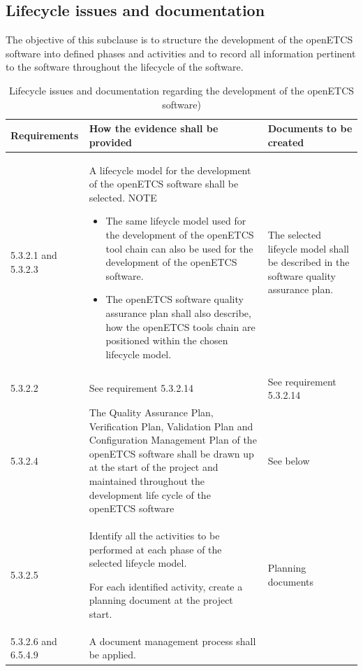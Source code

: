 \documentclass{template/openetcs_report}
\begin{document}
\subsection{Lifecycle issues and documentation}
\label{SDLC2}
\begin{flushleft}
The objective of this subclause is to structure the development of the openETCS software into defined phases and activities and to record all information pertinent to the software throughout the lifecycle of the software.
\end{flushleft}
{\footnotesize\sffamily\centering
\begin{longtable}{|p{2cm}|p{9cm}|p{3cm}|}
\caption{Lifecycle issues and documentation regarding the development of the openETCS software)}\\
\hline
\bfseries Requirements & \bfseries How the evidence shall be provided & \bfseries Documents to be created\\
\hline
\hline
\endhead
\hline
\endfoot

5.3.2.1 and 5.3.2.3 & A lifecycle model for the development of the openETCS software shall be selected.
\linebreak
\linebreak
NOTE
\begin{itemize}\itemsep=0pt
  \item The same lifeycle model used for the development of the openETCS tool chain can also be used for the development of the openETCS software.
  \item The openETCS software quality assurance plan shall also describe, how the openETCS tools chain are positioned within the chosen lifecycle model.
\end{itemize}
& The selected lifeycle model shall be described in the software quality assurance plan.\\ 
\hline
5.3.2.2 & See requirement 5.3.2.14 & See requirement 5.3.2.14\\ 
\hline
5.3.2.4 & The Quality Assurance Plan, Verification Plan, Validation Plan and Configuration Management Plan of the openETCS software shall be drawn up at the start of the project and maintained throughout the development life cycle of the openETCS software & See below\\ 
\hline
5.3.2.5 & Identify all the activities to be performed at each phase of the selected lifeycle model. 

For each identified activity, create a planning document at the project start.
& Planning documents\\ 
\hline
5.3.2.6 and 6.5.4.9 & A document management process shall be applied. 


\end{longtable}}
\end{document}
